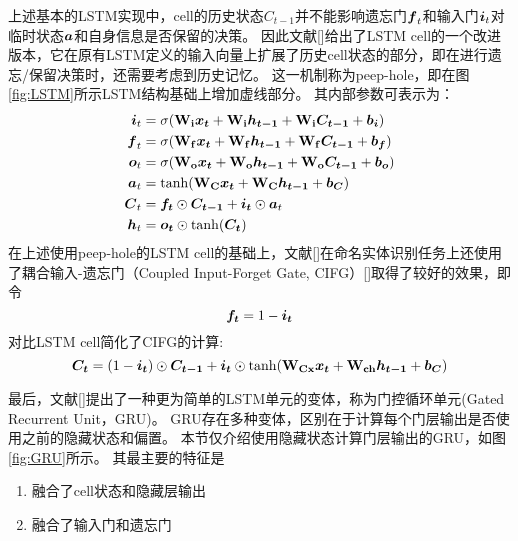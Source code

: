 上述基本的LSTM实现中，cell的历史状态$C_{t-1}$并不能影响遗忘门$\boldsymbol{f}_t$和输入门$\boldsymbol{i}_t$对临时状态$\boldsymbol{a}$和自身信息是否保留的决策。
因此文献[]给出了LSTM cell的一个改进版本，它在原有LSTM定义的输入向量上扩展了历史cell状态的部分，即在进行遗忘/保留决策时，还需要考虑到历史记忆。
这一机制称为peep-hole，即在图\ref{fig:LSTM}所示LSTM结构基础上增加虚线部分。
其内部参数可表示为：
\begin{align}
    \boldsymbol{i}_t &= \sigma(\boldsymbol{\mathbf{W_{i}}}\boldsymbol{x_{t}} + \boldsymbol{\mathbf{W_{i}}}\boldsymbol{h_{t-1}} + \boldsymbol{\mathbf{W_{i}}}\boldsymbol{C_{t-1}} + \boldsymbol{b_i})\\
    \boldsymbol{f}_t &= \sigma(\boldsymbol{\mathbf{W_{f}}}\boldsymbol{x_{t}} + \boldsymbol{\mathbf{W_{f}}}\boldsymbol{h_{t-1}} + \boldsymbol{\mathbf{W_{f}}}\boldsymbol{C_{t-1}} + \boldsymbol{b_f})\\
    \boldsymbol{o}_t &= \sigma(\boldsymbol{\mathbf{W_{o}}}\boldsymbol{x_{t}} + \boldsymbol{\mathbf{W_{o}}}\boldsymbol{h_{t-1}} + \boldsymbol{\mathbf{W_{o}}}\boldsymbol{C_{t-1}} + \boldsymbol{b_o})\\
    \boldsymbol{a}_t &= \tanh(\boldsymbol{\mathbf{W_{C}}}\boldsymbol{x_t} + \boldsymbol{\mathbf{W_{C}}}\boldsymbol{h_{t-1}} + \boldsymbol{b_{C}})\\
    \boldsymbol{C}_t &= \boldsymbol{f_t}\odot\boldsymbol{C_{t-1}} + \boldsymbol{i_t}\odot \boldsymbol{a}_t \\
    \boldsymbol{h}_t &= \boldsymbol{o_t} \odot \tanh(\boldsymbol{C_t})
\end{align}
在上述使用peep-hole的LSTM cell的基础上，文献[]在命名实体识别任务上还使用了耦合输入-遗忘门（Coupled Input-Forget Gate, CIFG）[]取得了较好的效果，即令
\begin{equation}
    \boldsymbol{f_t} = 1 - \boldsymbol{i_t}
\end{equation}
对比LSTM cell简化了CIFG的计算:
\begin{equation}
    \boldsymbol{C_t} = (1 - \boldsymbol{i_t})\odot \boldsymbol{C_{t-1}} + \boldsymbol{i_t}\odot \tanh(\boldsymbol{\mathbf{W_{Cx}}}\boldsymbol{x_t} + \boldsymbol{\mathbf{W_{ch}}}\boldsymbol{h_{t-1}} + \boldsymbol{b_C})
\end{equation}

最后，文献[]提出了一种更为简单的LSTM单元的变体，称为门控循环单元(Gated Recurrent Unit，GRU)。
GRU存在多种变体，区别在于计算每个门层输出是否使用之前的隐藏状态和偏置。
本节仅介绍使用隐藏状态计算门层输出的GRU，如图\ref{fig:GRU}所示。
其最主要的特征是
\begin{enumerate}
    \item 融合了cell状态和隐藏层输出
    \item 融合了输入门和遗忘门
\end{enumerate}

